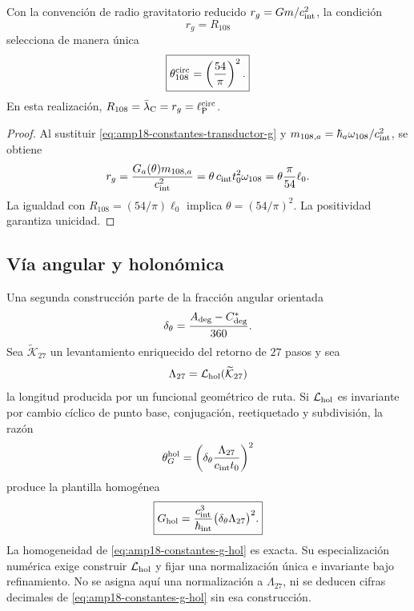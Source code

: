 \begin{theorem}
Con la convención de radio gravitatorio reducido
\(r_g=Gm/c_{\rm int}^2\), la condición
\[
 r_g=R_{108}
\]
selecciona de manera única
\begin{equation}
 \label{eq:amp18-constantes-selector-108}
 \boxed{
 \theta_{108}^{\rm circ}=\left(\frac{54}{\pi}\right)^2.}
\end{equation}
En esta realización,
\(R_{108}=\bar\lambda_{\rm C}=r_g=\ell_{\rm P}^{\rm circ}\).
\end{theorem}

\begin{proof}
Al sustituir \eqref{eq:amp18-constantes-transductor-g} y
\(m_{108,a}=\hbar_a\omega_{108}/c_{\rm int}^2\), se obtiene
\[
 r_g
 =\frac{G_a(\theta)m_{108,a}}{c_{\rm int}^2}
 =\theta\,c_{\rm int}t_0^2\omega_{108}
 =\theta\frac{\pi}{54}\ell_0.
\]
La igualdad con \(R_{108}=(54/\pi)\ell_0\) implica
\(\theta=(54/\pi)^2\). La positividad garantiza unicidad.
\end{proof}

\subsection{Vía angular y holonómica}

Una segunda construcción parte de la fracción angular orientada
\begin{equation}
 \label{eq:amp18-constantes-delta-theta-g}
 \delta_\theta=\frac{A_{\rm deg}-C^*_{\rm deg}}{360}.
\end{equation}
Sea \(\widetilde{\mathcal K}_{27}\) un levantamiento enriquecido del retorno
de \(27\) pasos y sea
\[
 \Lambda_{27}=\mathcal L_{\rm hol}(\widetilde{\mathcal K}_{27})
\]
la longitud producida por un funcional geométrico de ruta. Si
\(\mathcal L_{\rm hol}\) es invariante por cambio cíclico de punto base, conjugación,
reetiquetado y subdivisión, la razón
\[
 \theta_G^{\rm hol}
 =\left(\delta_\theta
 \frac{\Lambda_{27}}{c_{\rm int}t_0}\right)^2
\]
produce la plantilla homogénea
\begin{equation}
 \label{eq:amp18-constantes-g-hol}
 \boxed{
 G_{\rm hol}
 =\frac{c_{\rm int}^{3}}{\hbar_{\rm int}}
 \bigl(\delta_\theta\Lambda_{27}\bigr)^2.}
\end{equation}
La homogeneidad de \eqref{eq:amp18-constantes-g-hol} es exacta. Su
especialización numérica exige construir \(\mathcal L_{\rm hol}\) y fijar una
normalización única e invariante bajo refinamiento. No se asigna aquí una
normalización a \(\Lambda_{27}\), ni se deducen cifras decimales de
\eqref{eq:amp18-constantes-g-hol} sin esa construcción.

